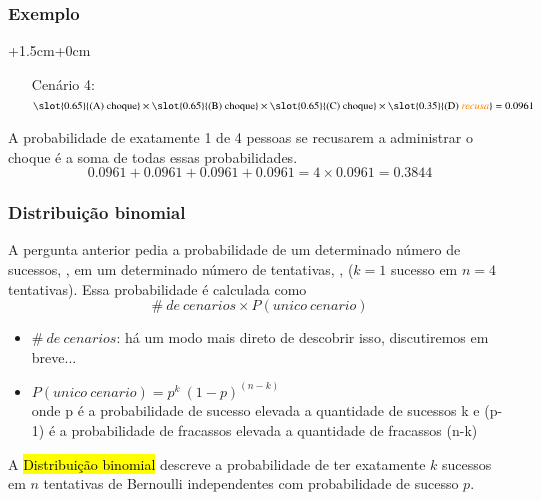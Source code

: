 \begin{frame}
\frametitle{Exemplo}

\begin{changemargin}{+1.5cm}{+0cm}
{\footnotesize
\begin{enumerate}

\item[Cenário 4:] $\slot{0.65}{\text{(A) choque}} \times \slot{0.65}{\text{(B) choque}} \times \slot{0.65}{\text{(C) choque}} \times \slot{0.35}{\text{(D) \orange{recusa}}} = 0.0961$
\end{enumerate}
}
\end{changemargin}
\pause
\justifying
A probabilidade de exatamente 1 de 4 pessoas se recusarem a administrar o choque é a soma de todas essas probabilidades.
\[ 0.0961+ 0.0961 + 0.0961 + 0.0961 = 4 \times 0.0961 = 0.3844 \]

\end{frame}


\begin{frame}
\frametitle{Distribuição binomial}
\justifying
A pergunta anterior pedia a probabilidade de um determinado número de sucessos, , em um determinado número de tentativas, , ($ k = 1 $ sucesso em $ n = 4 $ tentativas). Essa probabilidade é calculada como
\[ \#~ de ~ cenarios \times P(unico ~ cenario) \]

\pause

\begin{itemize}
\justifying
\item $\#~ de ~ cenarios$: há um modo mais direto de descobrir isso, discutiremos em breve...

\pause
\justifying
\item $P(unico ~ cenario) = p^k~(1-p)^{(n-k)}$ \\
\justifying
{\scriptsize{ onde p é a probabilidade de sucesso elevada a quantidade de sucessos k e (p-1) é a probabilidade de fracassos elevada a quantidade de fracassos (n-k)}}

\end{itemize}

\pause
\justifying
A \hl{Distribuição binomial} descreve a probabilidade de ter exatamente $ k $ sucessos em $ n $ tentativas de Bernoulli independentes com probabilidade de sucesso $p$.

\end{frame}


